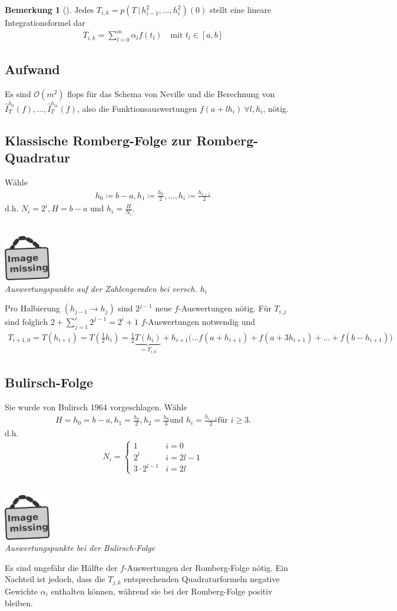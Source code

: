 \documentclass[ngerman,fontsize=11pt, paper=a4, parskip=half, titlepage=true, toc=bib]{scrbook}
\theoremstyle{definition}
\newtheorem{Bem}[Def]{Bemerkung}	%
\theoremstyle{plain}
\newcommand{\subsectione}[1]{\addtocounter{Def}{1}\subsection{#1}}
\newenvironment{Beme}[1][]{ %
  \begin{Bem}[#1]}
  {\end{Bem}
  \addtocounter{subsection}{1}}
\newcommand{\imagemissing}[1]{
  \begin{center}~\\
    \centering 
    \includegraphics[width=2cm]{images/image_missing.jpg}\\
    \textit{#1} \\
  \end{center}
}
\begin{document}
\begin{Beme}\label{7.3.3}
  Jedes $T_{i,k}=p(T\,|\,h_{i-1}^2,\ldots, h_i^2)(0)$ 
  stellt eine lineare Integrationsformel dar
  \begin{gather*}
    T_{i,k}=\sum_{l=0}^m \alpha_lf(t_l)
    \quad \text{mit } t_l\in[a,b]
  \end{gather*}
\end{Beme}

\subsectione{Aufwand}
Es sind $\mathcal{O}(m^2)$ flops für das Schema von Neville
und die Berechnung von 
$\hat{I}_T^{h_0}(f),\ldots, \hat{I}_T^{h_m}(f)$,
also die Funktionsauswertungen $f(a+lh_i)~\forall l,h_i$,
nötig.

\subsectione{Klassische Romberg-Folge zur Romberg-Quadratur}
Wähle 
\begin{gather}
  h_0\coloneqq b-a, 
  h_1\coloneqq \frac{h_0}{2}, \ldots, 
  h_i\coloneqq \frac{h_{i-1}}{2}
  \label{VII.3.7}
\end{gather}
d.h. $N_i=2^i, H=b-a$ und $h_i=\frac{H}{N_i}$.
\imagemissing{Auswertungspunkte auf der Zahlengeraden bei versch. $h_i$}
Pro Halbierung $(h_{j-1}\rightarrow h_j)$ sind $2^{j-1}$
neue $f$-Auswertungen nötig.
Für $T_{i,j}$ sind folglich $2+\sum_{j=1}^i2^{j-1}=2^i+1$
$f$-Auswertungen notwendig und
\begin{gather}
  T_{i+1,0}=T(h_{i+1})=T\left(\frac{1}{2}h_i\right)
  =\frac{1}{2}\underbrace{T(h_i)}_{=T_{i,0}}
  + h_{i+1}\big(\ldots f(a+h_{i+1})+f(a+3h_{i+1})+\ldots
  + f(b-h_{i+1})\big)
  \label{VII.3.8}
\end{gather}

\subsectione{Bulirsch-Folge}
Sie wurde von Bulirsch 1964 vorgeschlagen.
Wähle 
\begin{gather}
  H=h_0=b-a, h_1=\frac{h_0}{2},h_2=\frac{h_0}{3}
  \text{und }  h_i=\frac{h_{i-2}}{2} \text{für } i\geq 3.
  \label{VII.3.9}
\end{gather}
d.h. 
\begin{gather*}
  N_i = \begin{cases}1&i=0\\2^l&i=2l-1\\3\cdot2^{l-1}&i=2l\end{cases}
\end{gather*}
\imagemissing{Auswertungspunkte bei der Bulirsch-Folge}
Es sind ungefähr die Hälfte 
der $f$-Auswertungen der Romberg-Folge nötig.
Ein Nachteil ist jedoch,
dass die $T_{j,k}$ entsprechenden Quadraturformeln
negative Gewichte $\alpha_i$ enthalten können,
während sie bei der Romberg-Folge positiv bleiben.
\end{document}

